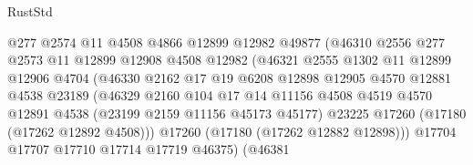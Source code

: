 \begin{lexlean}{RustStd}
\begin{coremodule}
{\begin{coremodule}
{{{{{{{{{{{{{{{{{{{{{{{{{{{{{{{{{{{{{{{{{{{{{{{{{{{{{{{                                @277
                                @2574
                                @11
                                @4508
                                @4866
                                @12899
                                @12982
                                @49877
                                (@46310
                                  @2556
                                  @277
                                  @2573
                                  @11
                                  @12899
                                  @12908
                                  @4508
                                  @12982
                                  (@46321
                                    @2555
                                    @1302
                                    @11
                                    @12899
                                    @12906
                                    @4704
                                    (@46330
                                      @2162
                                      @17
                                      @19
                                      @6208
                                      @12898
                                      @12905
                                      @4570
                                      @12881
                                      @4538
                                      @23189
                                      (@46329
                                        @2160
                                        @104
                                        @17
                                        @14
                                        @11156
                                        @4508
                                        @4519
                                        @4570
                                        @12891
                                        @4538
                                        (@23199 @2159 @11156 @45173 @45177)
                                        @23225
                                        @17260
                                        (@17180 (@17262 @12892 @4508)))
                                      @17260
                                      (@17180 (@17262 @12882 @12898)))
                                    @17704
                                    @17707
                                    @17710
                                    @17714
                                    @17719
                                    @46375)
                                  (@46381
}}}}}}}}}}}}}}}}}}}}}}}}}}}}}}}}}}}}}}}}}}}}}}}}}}}}}}}
\end{coremodule}}
\end{coremodule}
\end{lexlean}
